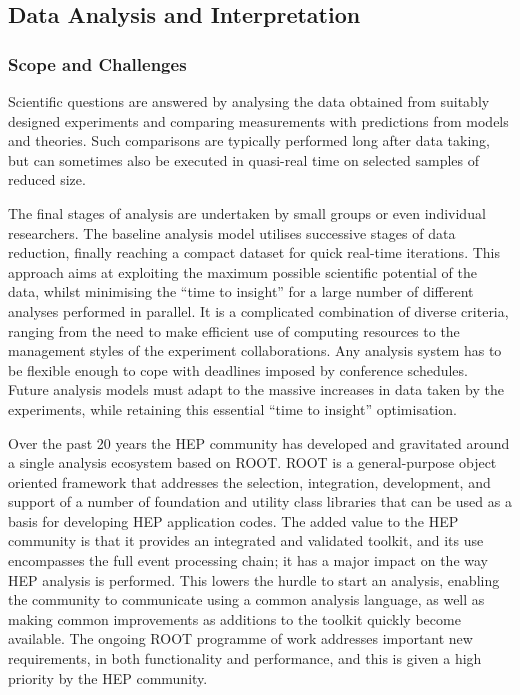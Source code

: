 \hypertarget{data-analysis-and-interpretation}{%
\subsection{Data Analysis and
Interpretation}\label{data-analysis-and-interpretation}}

\subsubsection*{Scope and Challenges}

Scientific questions are answered by analysing the data obtained from
suitably designed experiments and comparing measurements with
predictions from models and theories. Such comparisons are typically
performed long after data taking, but can sometimes also be executed in
quasi-real time on selected samples of reduced size.

The final stages of analysis are undertaken by small groups or even
individual researchers. The baseline analysis model utilises successive
stages of data reduction, finally reaching a compact dataset for quick
real-time iterations. This approach aims at exploiting the maximum
possible scientific potential of the data, whilst minimising the ``time
to insight'' for a large number of different analyses performed in
parallel. It is a complicated combination of diverse criteria, ranging
from the need to make efficient use of computing resources to the
management styles of the experiment collaborations. Any analysis system
has to be flexible enough to cope with deadlines imposed by conference
schedules. Future analysis models must adapt to the massive increases in
data taken by the experiments, while retaining this essential ``time to
insight'' optimisation.

Over the past 20 years the HEP community has developed and gravitated
around a single analysis ecosystem based on ROOT. 
ROOT is a general-purpose object
oriented framework that addresses the selection, integration,
development, and support of a number of foundation and utility class
libraries that can be used as a basis for developing HEP application
codes. The added value to the HEP community is that it provides an
integrated and validated toolkit, and its use encompasses the full event
processing chain; it has a major impact on the way HEP analysis is
performed. This lowers the hurdle to start an analysis, enabling the
community to communicate using a common analysis language, as well as
making common improvements as additions to the toolkit quickly become
available. The ongoing ROOT programme of work addresses important new
requirements, in both functionality and performance, and this is given
a high priority by the HEP community.

